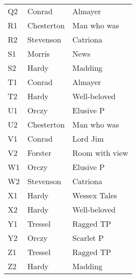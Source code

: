 \begin{table}
\begin{tabular}{l l l}
    Q2 & Conrad & Almayer \\
    R1 & Chesterton & Man who was \\
    R2 & Stevenson & Catriona \\
    S1 & Morris & News \\
    S2 & Hardy & Madding \\
    T1 & Conrad & Almayer \\
    T2 & Hardy & Well-beloved \\
    U1 & Orczy & Elusive P \\
    U2 & Chesterton & Man who was \\
    V1 & Conrad & Lord Jim \\
    V2 & Forster & Room with view \\
    W1 & Orczy & Elusive P \\
    W2 & Stevenson & Catriona \\
    X1 & Hardy & Wessex Tales \\
    X2 & Hardy & Well-beloved \\
    Y1 & Tressel & Ragged TP \\
    Y2 & Orczy & Scarlet P \\
    Z1 & Tressel & Ragged TP \\
    Z2 & Hardy & Madding \\
    \bottomrule
  \end{tabular}
\end{table}

